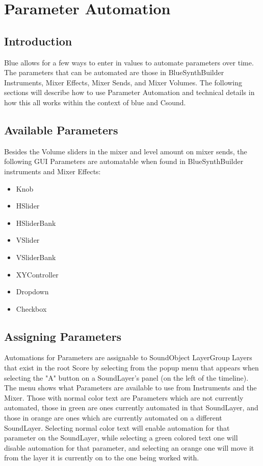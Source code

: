 \section{Parameter Automation}\label{parameterAutomation}

\subsection{Introduction}

Blue allows for a few ways to enter in values to automate parameters
over time. The parameters that can be automated are those in
BlueSynthBuilder Instruments, Mixer Effects, Mixer Sends, and Mixer
Volumes. The following sections will describe how to use Parameter
Automation and technical details in how this all works within the
context of blue and Csound.

\subsection{Available Parameters}

Besides the Volume sliders in the mixer and level amount on mixer sends,
the following GUI Parameters are automatable when found in
BlueSynthBuilder instruments and Mixer Effects:

\begin{itemize}
\item
  Knob
\item
  HSlider
\item
  HSliderBank
\item
  VSlider
\item
  VSliderBank
\item
  XYController
\item
  Dropdown
\item
  Checkbox
\end{itemize}

\subsection{Assigning Parameters}

Automations for Parameters are assignable to SoundObject LayerGroup
Layers that exist in the root Score by selecting from the popup menu
that appears when selecting the "A" button on a SoundLayer's panel (on
the left of the timeline). The menu shows what Parameters are available
to use from Instruments and the Mixer. Those with normal color text are
Parameters which are not currently automated, those in green are ones
currently automated in that SoundLayer, and those in orange are ones
which are currently automated on a different SoundLayer. Selecting
normal color text will enable automation for that parameter on the
SoundLayer, while selecting a green colored text one will disable
automation for that parameter, and selecting an orange one will move it
from the layer it is currently on to the one being worked with.

